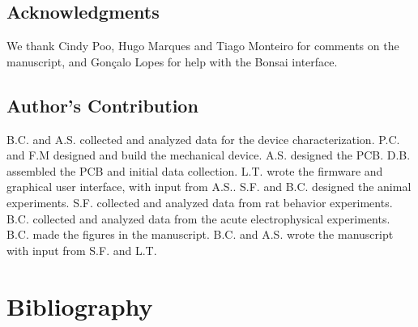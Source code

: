 \subsection*{Acknowledgments}\label{s:acknowledgments}
We thank Cindy Poo, Hugo Marques and Tiago Monteiro for comments on the manuscript, and Gonçalo Lopes for help with the Bonsai interface.

\subsection*{Author's Contribution}\label{s:contributions}
B.C. and A.S. collected and analyzed data for the device characterization. P.C. and F.M designed and build the mechanical device. A.S. designed the PCB. D.B. assembled the PCB and initial data collection. L.T. wrote the firmware and graphical user interface, with input from A.S.. S.F. and B.C. designed the animal experiments. S.F. collected and analyzed data from rat behavior experiments. B.C. collected and analyzed data from the acute electrophysical experiments. B.C. made the figures in the manuscript. B.C. and A.S. wrote the manuscript with input from S.F. and L.T.


\section*{Bibliography}



